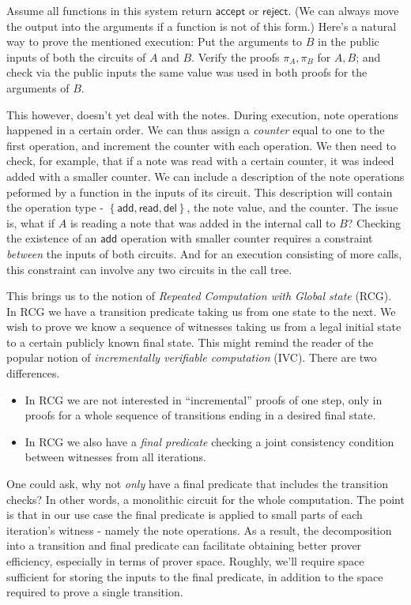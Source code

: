 \documentclass[11pt]{article} %
\newcommand{\rej}{\ensuremath{\mathsf{reject}}\xspace}
\newcommand{\acc}{\ensuremath{\mathsf{accept}}\xspace}
\newcommand{\prf}{\ensuremath{\mathsf{\pi}}\xspace}
\newcommand{\set}[1]{\ensuremath{\left\{#1\right\}}\xspace}
\newcommand{\add}{\ensuremath{\mathsf{add}}\xspace}
\newcommand{\del}{\ensuremath{\mathsf{del}}\xspace}
\renewcommand{\read}{\ensuremath{\mathsf{read}}\xspace}
\begin{document}
Assume all functions in this system return \acc or \rej. (We can always move the output into the arguments if a function is not of this form.)
Here's a natural way to prove the mentioned execution: Put the arguments to $B$ in the public inputs of both the circuits of $A$ and $B$.
Verify the proofs $\prf_A,\prf_B$ for $A,B$; and check via the public inputs the same value was used in both proofs for the arguments of $B$.

This however, doesn't yet deal with the notes. During execution, note operations happened in a certain order.
We can thus assign a \emph{counter} equal to one to the first operation, and increment the counter with each operation.
We then need to check, for example, that if a note was read with a certain counter, it was indeed added
with a smaller counter.
We can include a description of the note operations peformed by a function  in the inputs of its circuit. This description will contain the operation type - \set{\add,\read,\del}, the note value, and the counter.
The issue is, what if $A$ is reading a note that was added in the internal call to $B$?
Checking the existence of an $\add$ operation with smaller counter requires a constraint \emph{between} the inputs of both circuits. And for an execution consisting of more calls, this constraint can involve any two circuits in the call tree. 

This brings us to the notion of \emph{Repeated Computation with Global state} (RCG). In RCG we have a transition predicate taking us from one state to the next. We wish to prove we know a sequence of witnesses taking us from a legal initial state to a certain publicly known final state. This might remind the reader of the popular notion of \emph{incrementally verifiable computation} (IVC). There are two differences.

\begin{itemize}
 \item 
In RCG we are not interested in ``incremental'' proofs of one step, only in proofs for a whole
sequence of transitions ending in a desired final state.

\item In RCG we also have a \emph{final predicate} checking a joint consistency condition between witnesses from all iterations.

\end{itemize}
 One could ask, why not \emph{only} have a final predicate that includes the transition checks? In other words, a monolithic circuit for the whole computation.
The point is that in our use case the final predicate is applied to small parts of each iteration's witness - namely the note operations. As a result, the decomposition into a transition and final predicate can facilitate obtaining better prover efficiency, especially in terms of prover space.
Roughly, we'll require space sufficient for storing the inputs to the final predicate, in addition to the space required to prove a single transition.
\end{document}
